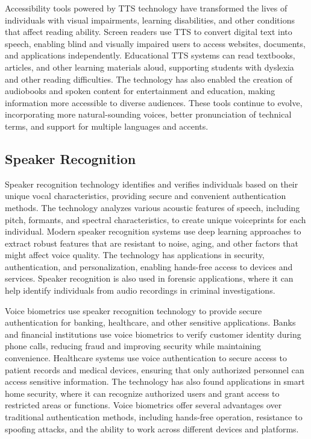 Accessibility tools powered by TTS technology have transformed the lives of individuals with visual impairments, learning disabilities, and other conditions that affect reading ability. Screen readers use TTS to convert digital text into speech, enabling blind and visually impaired users to access websites, documents, and applications independently. Educational TTS systems can read textbooks, articles, and other learning materials aloud, supporting students with dyslexia and other reading difficulties. The technology has also enabled the creation of audiobooks and spoken content for entertainment and education, making information more accessible to diverse audiences. These tools continue to evolve, incorporating more natural-sounding voices, better pronunciation of technical terms, and support for multiple languages and accents.

\subsection{Speaker Recognition}

Speaker recognition technology identifies and verifies individuals based on their unique vocal characteristics, providing secure and convenient authentication methods. The technology analyzes various acoustic features of speech, including pitch, formants, and spectral characteristics, to create unique voiceprints for each individual. Modern speaker recognition systems use deep learning approaches to extract robust features that are resistant to noise, aging, and other factors that might affect voice quality. The technology has applications in security, authentication, and personalization, enabling hands-free access to devices and services. Speaker recognition is also used in forensic applications, where it can help identify individuals from audio recordings in criminal investigations.

Voice biometrics use speaker recognition technology to provide secure authentication for banking, healthcare, and other sensitive applications. Banks and financial institutions use voice biometrics to verify customer identity during phone calls, reducing fraud and improving security while maintaining convenience. Healthcare systems use voice authentication to secure access to patient records and medical devices, ensuring that only authorized personnel can access sensitive information. The technology has also found applications in smart home security, where it can recognize authorized users and grant access to restricted areas or functions. Voice biometrics offer several advantages over traditional authentication methods, including hands-free operation, resistance to spoofing attacks, and the ability to work across different devices and platforms.

